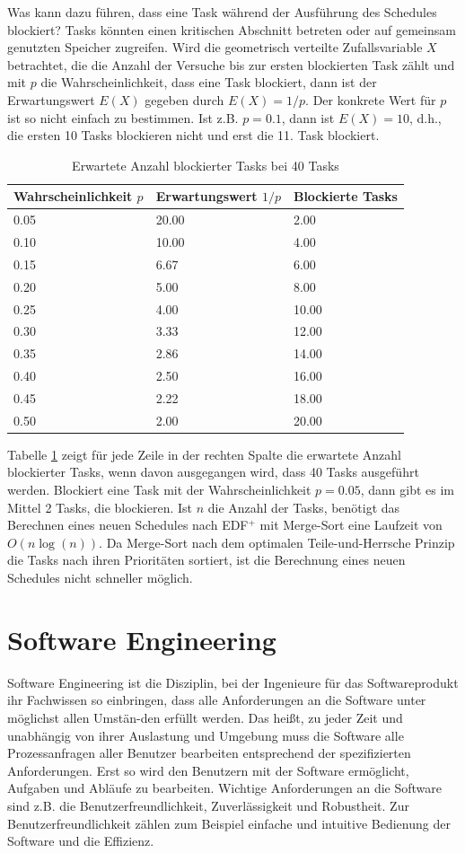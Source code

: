 \documentclass{scrarticle}
\numberwithin{equation}{section}
\begin{document}
Was kann dazu führen, dass eine Task während der Ausführung des Schedules blockiert? Tasks könnten einen kritischen Abschnitt betreten oder auf gemeinsam genutzten Speicher zugreifen. Wird die geometrisch verteilte Zufallsvariable $X$ betrachtet, die die Anzahl der Versuche bis zur ersten blockierten Task zählt und mit $p$ die Wahrscheinlichkeit, dass eine Task blockiert, dann ist der Erwartungswert $E(X)$ gegeben durch $E(X)= 1 / p$. Der konkrete Wert für $p$ ist so nicht einfach zu bestimmen. Ist z.B. $p = 0.1$, dann ist $E(X) = 10$, d.h., die ersten 10 Tasks blockieren nicht und erst die 11. Task blockiert.
\begin{table}[h]
	\centering
	\begin{tabular}{m{3.5cm}|m{3.5cm}|m{3.5cm}}
		\hline
		Wahrscheinlichkeit $p$ & Erwartungswert $1/p$ & Blockierte Tasks\\
		\hline\hline
		0.05 & 20.00 & 2.00 \\
		0.10 & 10.00 & 4.00 \\
		0.15 & 6.67 & 6.00 \\
		0.20 & 5.00 & 8.00 \\
		0.25 & 4.00 & 10.00 \\
		0.30 & 3.33 & 12.00 \\
		0.35 & 2.86 & 14.00 \\
		0.40 & 2.50 & 16.00 \\
		0.45 & 2.22 & 18.00 \\
		0.50 & 2.00 & 20.00 \\
		\hline
	\end{tabular}
	\caption{Erwartete Anzahl blockierter Tasks bei 40 Tasks}
	\label{tab:geometric-expectation}
\end{table}
Tabelle \ref{tab:geometric-expectation} zeigt für jede Zeile in der rechten Spalte die erwartete Anzahl blockierter Tasks, wenn davon ausgegangen wird, dass 40 Tasks ausgeführt werden. Blockiert eine Task mit der Wahrscheinlichkeit $p = 0.05$, dann gibt es im Mittel 2 Tasks, die blockieren. Ist $n$ die Anzahl der Tasks, benötigt das Berechnen eines neuen Schedules nach EDF$^+$ mit Merge-Sort eine Laufzeit von $O(n \log(n))$. Da Merge-Sort nach dem optimalen Teile-und-Herrsche Prinzip die Tasks nach ihren Prioritäten sortiert, ist die Berechnung eines neuen Schedules nicht schneller möglich. 


\section{Software Engineering}
Software Engineering ist die Disziplin, bei der Ingenieure für das Softwareprodukt ihr Fachwissen so einbringen, dass alle Anforderungen an die Software unter möglichst allen Umstän-den erfüllt werden. Das heißt, zu jeder Zeit und unabhängig von ihrer Auslastung und Umgebung muss die Software alle Prozessanfragen aller Benutzer bearbeiten entsprechend der spezifizierten Anforderungen. Erst so wird den Benutzern mit der Software ermöglicht, Aufgaben und Abläufe zu bearbeiten. Wichtige Anforderungen an die Software sind z.B. die Benutzerfreundlichkeit, Zuverlässigkeit und Robustheit. Zur Benutzerfreundlichkeit zählen zum Beispiel einfache und intuitive Bedienung der Software und die Effizienz.
\end{document}
